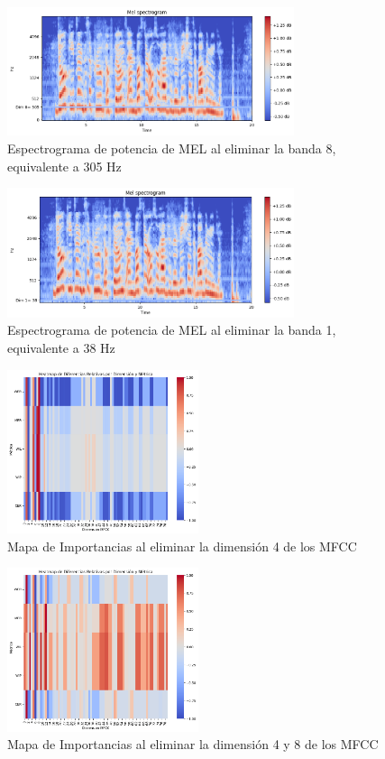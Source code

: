\documentclass[conference]{IEEEtran}
\begin{document}
\begin{figure}[h]
\centering
\includegraphics[width=0.75\textwidth]{images/dim_8_erasured.png}
\caption{Espectrograma de potencia de MEL al eliminar la banda 8, equivalente a 305 Hz}
\end{figure}

\begin{figure}[h]
\centering
\includegraphics[width=0.75\textwidth]{images/dim_1_erasured.png}
\caption{Espectrograma de potencia de MEL al eliminar la banda 1, equivalente a 38 Hz}
\end{figure}

\begin{figure}[h]
\centering
\includegraphics[width=0.5\textwidth]{images/importance_plot_no_dims_4.png}
\caption{Mapa de Importancias al eliminar la dimensión 4 de los MFCC}
\end{figure}

\begin{figure}[h]
\centering
\includegraphics[width=0.5\textwidth]{images/importance_plot_no_dims_4-8.png}
\caption{Mapa de Importancias al eliminar la dimensión 4 y 8 de los MFCC}
\end{figure}
\end{document}
